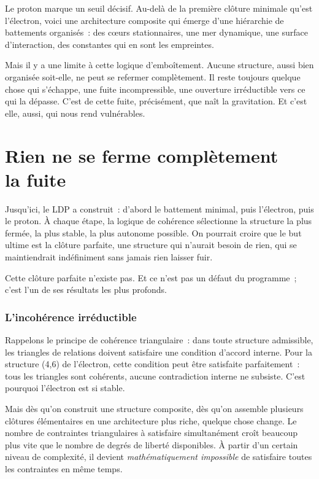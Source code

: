 \documentclass[12pt, a4paper, openright]{book}
\begin{document}
Le proton marque un seuil décisif. Au-delà de la première clôture minimale qu'est l'électron, voici une architecture composite qui émerge d'une hiérarchie de battements organisés~: des c\oe{}urs stationnaires, une mer dynamique, une surface d'interaction, des constantes qui en sont les empreintes.

\medskip

Mais il y a une limite à cette logique d'emboîtement. Aucune structure, aussi bien organisée soit-elle, ne peut se refermer complètement. Il reste toujours quelque chose qui s'échappe, une fuite incompressible, une ouverture irréductible vers ce qui la dépasse. C'est de cette fuite, précisément, que naît la gravitation. Et c'est elle, aussi, qui nous rend vulnérables.

\chapter[Rien ne se ferme complètement --- la fuite]{Rien ne se ferme complètement \\ la fuite}

Jusqu'ici, le LDP a construit~: d'abord le battement minimal, puis l'électron, puis le proton. À chaque étape, la logique de cohérence sélectionne la structure la plus fermée, la plus stable, la plus autonome possible. On pourrait croire que le but ultime est la clôture parfaite, une structure qui n'aurait besoin de rien, qui se maintiendrait indéfiniment sans jamais rien laisser fuir.

\medskip

Cette clôture parfaite n'existe pas. Et ce n'est pas un défaut du programme~; c'est l'un de ses résultats les plus profonds.

\subsection*{L'incohérence irréductible}

Rappelons le principe de cohérence triangulaire~: dans toute structure admissible, les triangles de relations doivent satisfaire une condition d'accord interne. Pour la structure (4,6) de l'électron, cette condition peut être satisfaite parfaitement~: tous les triangles sont cohérents, aucune contradiction interne ne subsiste. C'est pourquoi l'électron est si stable.

\medskip

Mais dès qu'on construit une structure composite, dès qu'on assemble plusieurs clôtures élémentaires en une architecture plus riche, quelque chose change. Le nombre de contraintes triangulaires à satisfaire simultanément croît beaucoup plus vite que le nombre de degrés de liberté disponibles. À partir d'un certain niveau de complexité, il devient \emph{mathématiquement impossible} de satisfaire toutes les contraintes en même temps.
\end{document}
